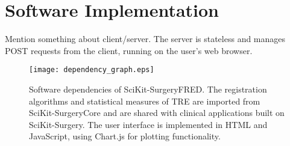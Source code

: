 \section{Software Implementation}

Mention something about client/server. The server is stateless and manages POST requests from the client, running on the user's web browser.

\begin{figure}
	\begin{center}
	\texttt{[image: dependency\_graph.eps]}
		\caption{\label{fig:dependencies}Software dependencies of SciKit-SurgeryFRED. The registration algorithms and statistical measures of {TRE} are imported from SciKit-SurgeryCore and are shared with clinical applications built on SciKit-Surgery. The user interface is implemented in HTML and JavaScript, using Chart.js for plotting functionality.}
	\end{center}
\end{figure}

